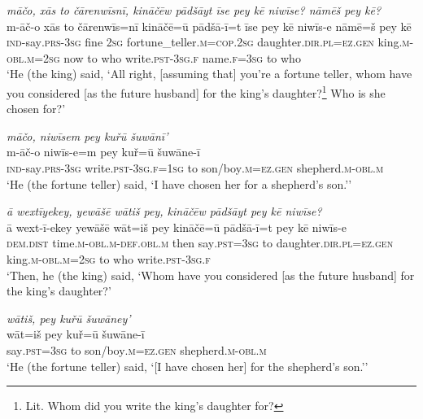 \ea \label{KŠ.12}
\textit{māčo, xās to čārenwīsnī, kināčēw pādšāyt īse pey kē niwīse? nāmēš pey kē?} \\ 
\gll m-āč-o xās to čārenwīs=nī kināčē=ū pādšā-ī=t īse pey kē niwīs-e nāmē=š pey kē \\ 
 \textsc{ind-}say\textsc{.prs}\textsc{-3sg} fine \textsc{2sg} fortune\_teller\textsc{.m}\textsc{=cop}\textsc{.\textsc{2sg}} daughter\textsc{.dir}\textsc{.pl}\textsc{=ez.gen} king\textsc{.m}\textsc{-obl}\textsc{.m}\textsc{=\textsc{2sg}} now to who write\textsc{.pst}\textsc{-3sg}\textsc{.f} name\textsc{.f}\textsc{=3sg} to who \\ 
\glt `He (the king) said, ‘All right, [assuming that] you’re a fortune teller, whom have you considered [as the future husband] for the king’s daughter?\footnote{Lit. Whom did you write the king’s daughter for?} Who is she chosen for?'
\z 
 
\ea \label{KŠ.13}
\textit{māčo, niwīsem pey kuřū šuwānī’} \\ 
\gll m-āč-o niwīs-e=m pey kuř=ū šuwāne-ī \\ 
 \textsc{ind-}say\textsc{.prs}\textsc{-3sg} write\textsc{.pst}\textsc{-3sg}\textsc{.f}\textsc{=\textsc{1sg}} to son/boy\textsc{.m}\textsc{=ez.gen} shepherd\textsc{.m}\textsc{-obl}\textsc{.m} \\ 
\glt `He (the fortune teller) said, ‘I have chosen her for a shepherd’s son.’'
\z 
 
\ea \label{KŠ.15}
\textit{ā wextīyekey, yewāšē wātiš pey, kināčēw pādšāyt pey kē niwīse?} \\ 
\gll ā wext-ī-ekey yewāšē wāt=iš pey kināčē=ū pādšā-ī=t pey kē niwīs-e \\ 
 \textsc{dem.dist} time\textsc{.m}\textsc{-obl}\textsc{.m}\textsc{-def}\textsc{.obl}\textsc{.m} then say\textsc{.pst}\textsc{=3sg} to daughter\textsc{.dir}\textsc{.pl}\textsc{=ez.gen} king\textsc{.m}\textsc{-obl}\textsc{.m}\textsc{=\textsc{2sg}} to who write\textsc{.pst}\textsc{-3sg}\textsc{.f} \\ 
\glt `Then, he (the king) said, ‘Whom have you considered [as the future husband] for the king’s daughter?'
\z 
 
\ea \label{KŠ.16}
\textit{wātiš, pey kuřū šuwāney’} \\ 
\gll wāt=iš pey kuř=ū šuwāne-ī \\ 
 say\textsc{.pst}\textsc{=3sg} to son/boy\textsc{.m}\textsc{=ez.gen} shepherd\textsc{.m}\textsc{-obl}\textsc{.m} \\ 
\glt `He (the fortune teller) said, ‘[I have chosen her] for the shepherd’s son.’'
\z 
 

